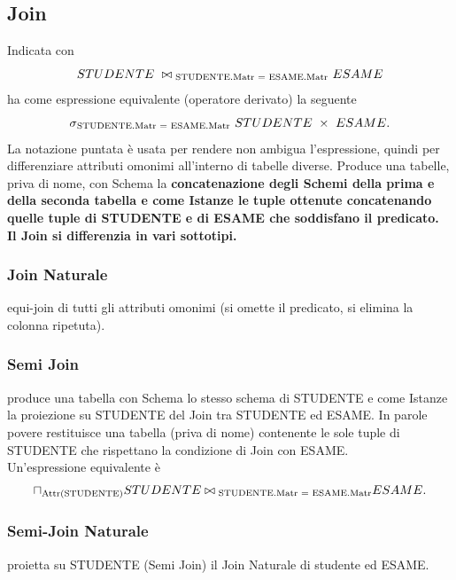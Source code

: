 \documentclass[11pt]{article} %
\begin{document}
\subsection{Join}
Indicata con $$ STUDENTE\  \bowtie \textsubscript{STUDENTE.Matr = ESAME.Matr}\  ESAME $$ ha come espressione equivalente (operatore derivato) la seguente $$ \sigma \textsubscript{STUDENTE.Matr = ESAME.Matr} \ STUDENTE\ \times\ ESAME. $$
La notazione puntata è usata per rendere non ambigua l'espressione, quindi per differenziare attributi omonimi all'interno di tabelle diverse. Produce una tabelle, priva di nome, con Schema la \bf concatenazione \rm degli Schemi della prima e della seconda tabella e come Istanze le tuple ottenute concatenando quelle tuple di STUDENTE e di ESAME che soddisfano il predicato.\\
Il Join si differenzia in vari sottotipi.
\subsubsection{Join Naturale} equi-join di tutti gli attributi omonimi (si omette il predicato, si elimina la colonna ripetuta).
\subsubsection{Semi Join} produce una tabella con Schema lo stesso schema di STUDENTE e come Istanze la proiezione su STUDENTE del Join tra STUDENTE ed ESAME. In parole povere restituisce una tabella (priva di nome) contenente le sole tuple di STUDENTE che rispettano la condizione di Join con ESAME.\\
Un'espressione equivalente è $$ \sqcap \textsubscript{Attr(STUDENTE)} STUDENTE \bowtie \textsubscript{STUDENTE.Matr = ESAME.Matr} ESAME. $$
\subsubsection{Semi-Join Naturale} proietta su STUDENTE (Semi Join) il Join Naturale di studente ed ESAME.
\end{document}
